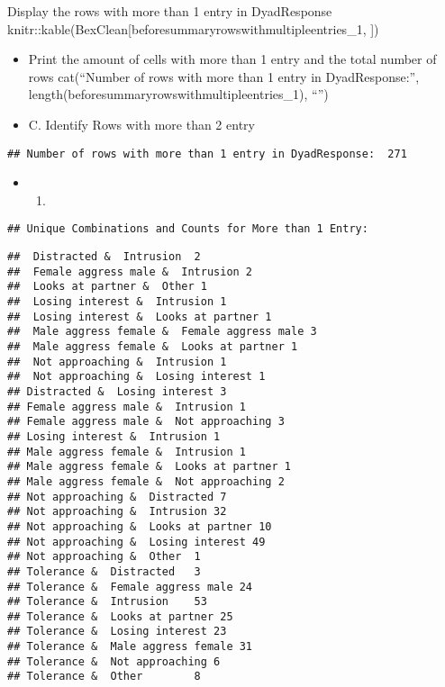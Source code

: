 \documentclass[
]{article}
\providecommand{\tightlist}{%
  \setlength{\itemsep}{0pt}\setlength{\parskip}{0pt}}
\begin{document}
Display the rows with more than 1 entry in DyadResponse
knitr::kable(BexClean{[}beforesummaryrowswithmultipleentries\_1, {]})

\begin{itemize}
\item
  Print the amount of cells with more than 1 entry and the total number
  of rows cat(``Number of rows with more than 1 entry in
  DyadResponse:'', length(beforesummaryrowswithmultipleentries\_1),
  ``\n'')
\item
  C. Identify Rows with more than 2 entry
\end{itemize}

\begin{verbatim}
## Number of rows with more than 1 entry in DyadResponse:  271
\end{verbatim}

\begin{itemize}
\item
  \begin{enumerate}
  \def\labelenumi{\Alph{enumi}.}
  \setcounter{enumi}{3}
  \tightlist
  \item
  \end{enumerate}
\end{itemize}

\begin{verbatim}
## Unique Combinations and Counts for More than 1 Entry:
\end{verbatim}

\begin{verbatim}
##  Distracted &  Intrusion  2
##  Female aggress male &  Intrusion 2
##  Looks at partner &  Other 1
##  Losing interest &  Intrusion 1
##  Losing interest &  Looks at partner 1
##  Male aggress female &  Female aggress male 3
##  Male aggress female &  Looks at partner 1
##  Not approaching &  Intrusion 1
##  Not approaching &  Losing interest 1
## Distracted &  Losing interest 3
## Female aggress male &  Intrusion 1
## Female aggress male &  Not approaching 3
## Losing interest &  Intrusion 1
## Male aggress female &  Intrusion 1
## Male aggress female &  Looks at partner 1
## Male aggress female &  Not approaching 2
## Not approaching &  Distracted 7
## Not approaching &  Intrusion 32
## Not approaching &  Looks at partner 10
## Not approaching &  Losing interest 49
## Not approaching &  Other  1
## Tolerance &  Distracted   3
## Tolerance &  Female aggress male 24
## Tolerance &  Intrusion    53
## Tolerance &  Looks at partner 25
## Tolerance &  Losing interest 23
## Tolerance &  Male aggress female 31
## Tolerance &  Not approaching 6
## Tolerance &  Other        8
\end{verbatim}
\end{document}
